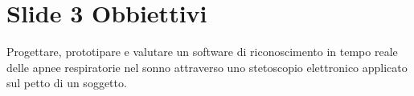 \section{Slide 3 Obbiettivi}
    Progettare, prototipare e valutare un software di riconoscimento in tempo reale delle apnee respiratorie nel sonno attraverso uno stetoscopio elettronico applicato sul petto di un soggetto.